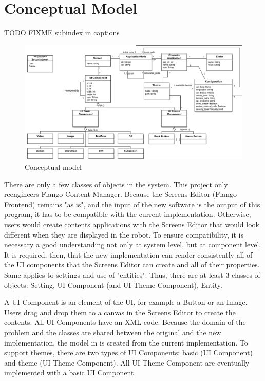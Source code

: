 \section{Conceptual Model}
TODO FIXME subindex in captions
\begin{figure}   
    \centering
    \includegraphics[width=\textwidth]{figures/specification-conceptual-model}
    \caption{Conceptual model}
    \label{fig:specification-conceptual-model}
\end{figure}

There are only a few classes of objects in the system.
This project only reengineers Flango Content Manager.
Because the Screens Editor (Flango Frontend) remains "as is", and the input of the new software is the output of this program, it has to be compatible with the current implementation.
Otherwise, users would create contents applications with the Screens Editor that would look different when they are displayed in the robot.
To ensure compatibility, it is necessary a good understanding not only at system level, but at component level.
It is required, then, that the new implementation can render consistently all of the \ac{UI} components that the Screens Editor can create and all of their properties. 
Same applies to settings and use of "entities".
Thus, there are at least 3 classes of objects: Setting, UI Component (and UI Theme Component), Entity.

A UI Component is an element of the \ac{UI}, for example a Button or an Image.
Users drag and drop them to a canvas in the Screens Editor to create the contents. 
All UI Components have an \ac{XML} code.
Because the domain of the problem and the classes are shared between the original and the new implementation, the model in  is created from the current implementation.
To support themes, there are two types of UI Components: basic (UI Component) and theme (UI Theme Component).
All UI Theme Component are eventually implemented with a basic UI Component.

